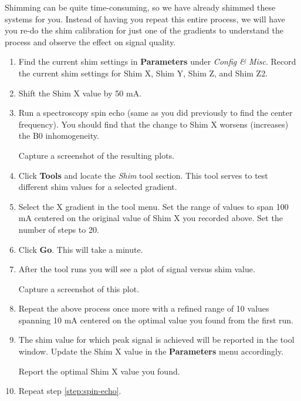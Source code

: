 \vspace{5mm}

\noindent{} Shimming can be quite time-consuming, so we have already shimmed these systems for you. Instead of having you repeat this entire process, we will have you re-do the shim calibration for just one of the gradients to understand the process and observe the effect on signal quality.

\begin{enumerate}
  \item Find the current shim settings in \textbf{Parameters} under \emph{Config \& Misc}.
  \noindent{}\color{red} Record the current shim settings for Shim X, Shim Y, Shim Z, and Shim Z2. 
  \color{black}
  \item Shift the Shim X value by 50 mA.
  \item \label{step:spin-echo} Run a spectroscopy spin echo (same as you did previously to find the center frequency). You should find that the change to Shim X worsens (increases) the B0 inhomogeneity.
  
  \noindent{}\color{red} Capture a screenshot of the resulting plots.
  \color{black}
  \item Click \textbf{Tools} and locate the \emph{Shim} tool section. This tool serves to test different shim values for a selected gradient. 
  \item Select the X gradient in the tool menu. Set the range of values to span 100 mA centered on the original value of Shim X you recorded above. Set the number of steps to 20.
  \item Click \textbf{Go}. This will take a minute.
  \item After the tool runs you will see a plot of signal versus shim value.
  
    \noindent{}\color{red}
  Capture a screenshot of this plot.
  \color{black}
  \item Repeat the above process once more with a refined range of 10 values spanning 10 mA centered on the optimal value you found from the first run.
  \item The shim value for which peak signal is achieved will be reported in the tool window. Update the Shim X value in the \textbf{Parameters} menu accordingly.
  
  \color{black}
     \noindent{}\color{red}
  Report the optimal Shim X value you found.
  \color{black}
  \item Repeat step \ref{step:spin-echo}.
\end{enumerate}

